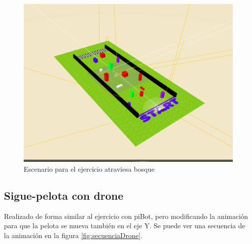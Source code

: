     \begin{figure}[H]
    \centering
    \includegraphics[scale=0.4]{img/atraviesabosque-indiv.png}
    \caption{Escenario para el ejercicio atraviesa bosque} 
    \label{fig:atraviesaBosqueind}
    \end{figure}
    
\subsection{Sigue-pelota con drone}
Realizado de forma similar al ejercicio con piBot, pero modificando la animación para que la pelota se mueva también en el eje Y. Se puede ver una secuencia de la animación en la figura \ref{fig:secuenciaDrone}.


